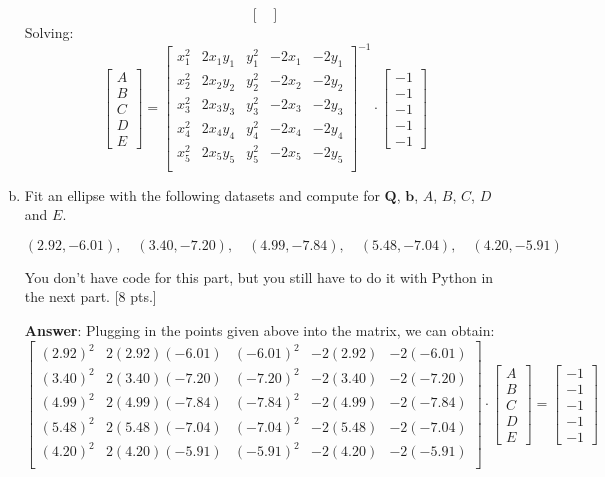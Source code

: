 \begin{enumerate}[a.)]
\[\begin{bmatrix}
\end{bmatrix}
\]
Solving:
\[
\begin{bmatrix}
A \\ B \\ C \\ D \\ E
\end{bmatrix}
=
\begin{bmatrix}
x_1^2 & 2x_1 y_1 & y_1^2 & -2x_1 & -2y_1 \\
x_2^2 & 2x_2 y_2 & y_2^2 & -2x_2 & -2y_2 \\
x_3^2 & 2x_3 y_3 & y_3^2 & -2x_3 & -2y_3 \\
x_4^2 & 2x_4 y_4 & y_4^2 & -2x_4 & -2y_4 \\
x_5^2 & 2x_5 y_5 & y_5^2 & -2x_5 & -2y_5 \\
\end{bmatrix}^{-1} \cdot
\begin{bmatrix}
-1 \\ -1 \\ -1 \\ -1 \\ -1
\end{bmatrix}
\]

\item 
Fit an ellipse with the following datasets and compute for $\mathbf{Q}$, $\mathbf{b}$, $A$, $B$, $C$, $D$ and $E$.

\begin{equation*}
    (2.92, -6.01), \quad (3.40, -7.20), \quad (4.99, -7.84), \quad (5.48, -7.04), \quad (4.20, -5.91)
\end{equation*}

 You don't have code for this part, but you still have to do it with Python in the next part. [8 pts.]

\textbf{Answer}:
Plugging in the points given above into the matrix, we can obtain: \\

\[
\begin{bmatrix}
(2.92)^2 & 2(2.92) (-6.01) & (-6.01)^2 & -2(2.92) & -2(-6.01) \\
(3.40)^2 & 2(3.40) (-7.20) & (-7.20)^2 & -2(3.40) & -2(-7.20) \\
(4.99)^2 & 2(4.99) (-7.84) & (-7.84)^2 & -2(4.99) & -2(-7.84) \\
(5.48)^2 & 2(5.48) (-7.04) & (-7.04)^2 & -2(5.48) & -2(-7.04) \\
(4.20)^2 & 2(4.20) (-5.91) & (-5.91)^2 & -2(4.20) & -2(-5.91) \\
\end{bmatrix} \cdot
\begin{bmatrix}
A \\ B \\ C \\ D \\ E
\end{bmatrix}
=
\begin{bmatrix}
-1 \\ -1 \\ -1 \\ -1 \\ -1
\end{bmatrix}
\]


\end{enumerate}
